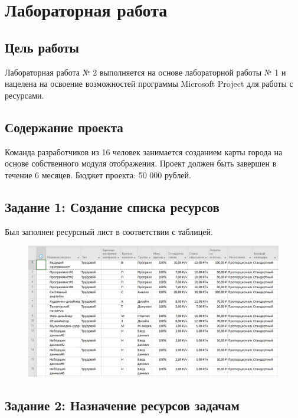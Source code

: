 \chapter{Лабораторная работа}

\section{Цель работы}

Лабораторная работа № 2 выполняется на основе лабораторной работы № 1 и нацелена на освоение возможностей программы Microsoft Project для работы с ресурсами.

\section{Содержание проекта}

Команда разработчиков из 16 человек занимается созданием карты города на основе собственного модуля отображения. Проект должен быть завершен в течение 6 месяцев. Бюджет проекта: 50 000 рублей.

\section{Задание 1: Создание списка ресурсов}

Был заполнен ресурсный лист в соответствии с таблицей.

\begin{figure}[H]
	\begin{center}
		\includegraphics[width=\textwidth]{imgs/task_1_0.png}
	\end{center}
\end{figure}

\section{Задание 2: Назначение ресурсов задачам}

